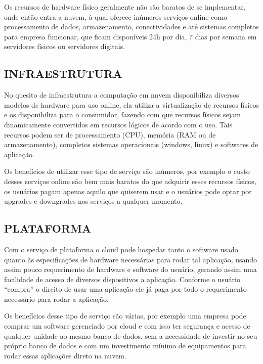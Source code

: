 \begin{justify}
    Os recursos de hardware físico geralmente não são baratos de se implementar, onde então
    entra a nuvem, à qual oferece inúmeros serviços online como processamento de dados,
    armazenamento, conectividades e até sistemas completos para empresa funcionar, que
    ficam disponíveis 24h por dia, 7 dias por semana em servidores físicos ou servidores
    digitais. \cite{rashid2019cloud}
    
    \subsection{INFRAESTRUTURA}
    No quesito de infraestrutura a computação em nuvem disponibiliza diversos modelos de
    hardware para uso online, ela utiliza a virtualização de recursos físicos e os disponibiliza
    para o consumidor, fazendo com que recursos físicos sejam dinamicamente convertidos em
    recursos lógicos de acordo com o uso. Tais recursos podem ser de processamento (CPU),
    memória (RAM ou de armazenamento), completos sistemas operacionais (windows, linux) e
    softwares de aplicação. \cite{pedrosa2011computaccao}

    Os benefícios de utilizar esse tipo de serviço são inúmeros, por exemplo o custo desses
    serviços online são bem mais baratos do que adquirir esses recursos físicos, os usuários
    pagam apenas aquilo que quiserem usar e o usuários pode optar por upgrades e
    downgrades nos serviços a qualquer momento.
    
    \subsection{PLATAFORMA}
    Com o serviço de plataforma o cloud pode hospedar tanto o software usado quanto às
    especificações de hardware necessárias para rodar tal aplicação, usando assim pouco
    requerimento de hardware e software do usuário, gerando assim uma facilidade de acesso
    de diversos dispositivos a aplicação. Conforme o usuário “compra” o direito de usar uma
    aplicação ele já paga por todo o requerimento necessário para rodar a aplicação.

    Os benefícios desse tipo de serviço são várias, por exemplo uma empresa pode comprar
    um software gerenciado por cloud e com isso ter segurança e acesso de qualquer unidade
    ao mesmo banco de dados, sem a necessidade de investir no seu próprio banco de dados e
    com um investimento mínimo de equipamentos para rodar essas aplicações direto na
    nuvem.\cite{rashid2019cloud}


\end{justify}
